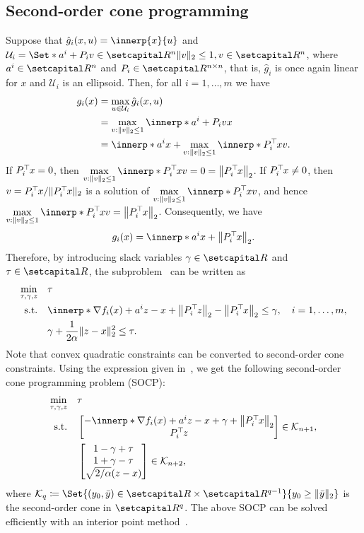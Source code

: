 \documentclass[../../main]{subfiles}
\begin{document}
\subsection{Second-order cone programming} 
Suppose that $\hat{g}_i (x,u) = \innerp{x}{u}$ and ${\mathcal{U}}_i = \Set*{ a^i + P_i v \in \setR^n }{ \norm{v}_2 \leq 1, v \in \setR^n }$, where $a^i \in \setR^n$ and $P_i \in \setR^{n \times n}$, that is, $\hat{g}_i$ is once again linear for $x$ and $\mathcal{U}_i$ is an ellipsoid.
Then, for all $i = 1,\dots,m$ we have
\begin{align}
g_i (x) &=  \max_{u \in {\mathcal{U}}_i } \hat{g}_i (x,u) \\
&=\max_{v : \norm{v}_2 \leq 1} \innerp*{a^i + P_i v}{x} \\
&= \innerp*{a^i}{x} + \max_{v : \norm{v}_2 \leq 1} \innerp*{P_i^\T x}{v}.
\end{align}
If $P_i^\top\hspace{-1pt} x = 0$, then $\displaystyle \max_{v : \norm{v}_2 \leq 1} \innerp*{P_i^\T x}{v} = 0 = \norm*{P_i^\T x}_2$.
If $P_i^\top\hspace{-1pt} x \neq 0$, then $v = P_i^\top\hspace{-1pt} x / \lVert P_i^\top\hspace{-1pt} x\rVert_2$ is a solution of $\displaystyle \max_{v : \norm{v}_2 \leq 1} \innerp*{P_i^\T x}{v}$, and hence $\displaystyle \max_{v : \norm{v}_2 \leq 1} \innerp*{P_i^\T x}{v} = \norm*{P_i^\T x}_2$.
Consequently, we have
\begin{equation}
	g_i(x) = \innerp*{a^i}{x} + \norm*{P_i^\T x}_2.
\end{equation}
Therefore, by introducing slack variables $\gamma \in \setR$ and $\tau \in \setR$, the subproblem~ can be written as
\begin{equation}
    \begin{aligned}
    \min_{\tau, \gamma, z} \quad   &\tau \\ 
    \st    \quad   &\innerp*{\nabla f_i(x) + a^i}{z - x} + \norm*{P_i^\T z}_2 - \norm*{P_i^\T x}_2 \leq \gamma, \quad i = 1,\ldots,m, \\
    & \gamma + \frac{1}{2 \alpha} \norm{z - x}_2^2 \leq \tau.
    \end{aligned}
\end{equation}
Note that convex quadratic constraints can be converted to second-order cone constraints.
Using the expression given in~\cite[Section 2.1]{Alizadeh2003}, we get the following second-order cone programming problem (SOCP):
\begin{equation}\label{eq:socp}
\begin{aligned}
\min_{\tau, \gamma, z} \quad   &\tau \\ 
\st    \quad   &\begin{bmatrix} - \innerp*{\nabla f_i(x) + a^i}{z - x} + \gamma + \norm*{P_i^\T x}_2 \\
P_i^\T z
\end{bmatrix} \in \mathcal{K}_{n + 1}, \\
& \begin{bmatrix} 1 - \gamma + \tau \\
1 + \gamma - \tau \\
\sqrt{2 / \alpha} (z - x) 
\end{bmatrix} \in \mathcal{K}_{n + 2},
\end{aligned}
\end{equation}
where $\mathcal{K}_q \coloneqq \Set{(y_0, \bar{y}) \in \setR \times \setR^{q - 1} }{ y_0 \geq \norm{ \bar{y} }_2}$ is the second-order cone in $\setR^{q}$.
The above SOCP can be solved efficiently with an interior point method~\cite{Alizadeh2003}.
\end{document}
